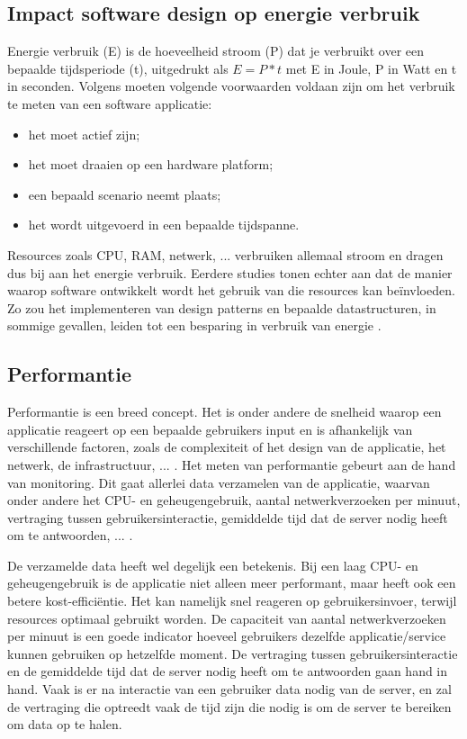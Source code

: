 
\subsection{Impact software design op energie verbruik}
Energie verbruik (E) is de hoeveelheid stroom (P) dat je verbruikt over een bepaalde tijdsperiode (t), uitgedrukt als \(E = P * t\) met E in Joule, P in Watt en t in seconden. Volgens \textcite{GustavoPinto2017} moeten volgende voorwaarden voldaan zijn om het verbruik te meten van een software applicatie:
\begin{itemize}
    \item het moet actief zijn;
    \item het moet draaien op een hardware platform;
    \item een bepaald scenario neemt plaats;
    \item het wordt uitgevoerd in een bepaalde tijdspanne.
\end{itemize}

Resources zoals CPU, RAM, netwerk, ... verbruiken allemaal stroom en dragen dus bij aan het energie verbruik. Eerdere studies tonen echter aan dat de manier waarop software ontwikkelt wordt het gebruik van die resources kan beïnvloeden. Zo zou het implementeren van design patterns en bepaalde datastructuren, in sommige gevallen, leiden tot een besparing in verbruik van energie \autocite{Georgiou2019}.


\subsection{Performantie}
Performantie is een breed concept. Het is onder andere de snelheid waarop een applicatie reageert op een bepaalde gebruikers input \autocite{Miskolczy2023} en is afhankelijk van verschillende factoren, zoals de complexiteit of het design van de applicatie, het netwerk, de infrastructuur, ... \autocite{Allen2024}. Het meten van performantie gebeurt aan de hand van monitoring. Dit gaat allerlei data verzamelen van de applicatie, waarvan onder andere het CPU- en geheugengebruik, aantal netwerkverzoeken per minuut, vertraging tussen gebruikersinteractie, gemiddelde tijd dat de server nodig heeft om te antwoorden, ... \autocite{Kanjilal2022}. 

De verzamelde data heeft wel degelijk een betekenis. Bij een laag CPU- en geheugengebruik is de applicatie niet alleen meer performant, maar heeft ook een betere kost-efficiëntie. Het kan namelijk snel reageren op gebruikersinvoer, terwijl resources optimaal gebruikt worden.
De capaciteit van aantal netwerkverzoeken per minuut is een goede indicator hoeveel gebruikers dezelfde applicatie/service kunnen gebruiken op hetzelfde moment. De vertraging tussen gebruikersinteractie en de gemiddelde tijd dat de server nodig heeft om te antwoorden gaan hand in hand. Vaak is er na interactie van een gebruiker data nodig van de server, en zal de vertraging die optreedt vaak de tijd zijn die nodig is om de server te bereiken om data op te halen. 

